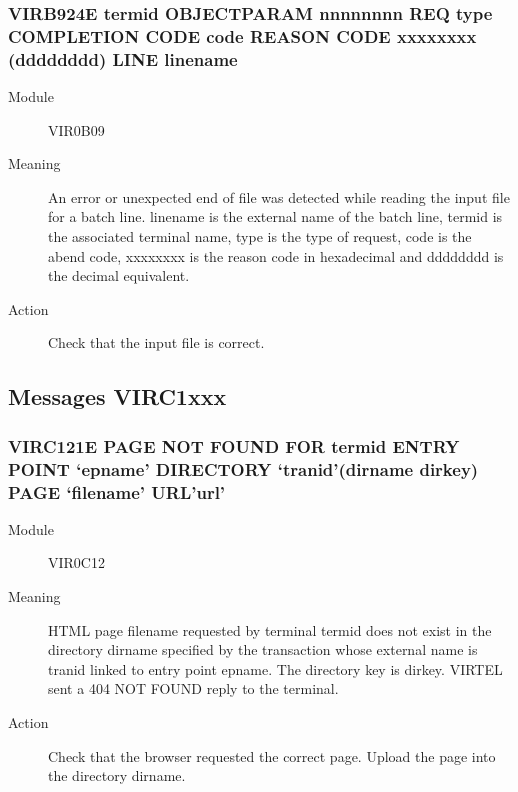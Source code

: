 \documentclass[letterpaper,10pt,english]{sphinxmanual}
\begin{document}
\subsubsection{VIRB924E termid OBJECT\textbar{}PARAM nnnnnnnn REQ type COMPLETION CODE code REASON CODE xxxxxxxx (dddddddd) LINE linename}
\label{\detokenize{messages:virb924e-termid-object-param-nnnnnnnn-req-type-completion-code-code-reason-code-xxxxxxxx-dddddddd-line-linename}}\begin{description}
\item[{Module}] \leavevmode
VIR0B09

\item[{Meaning}] \leavevmode
An error or unexpected end of file was detected while reading the input file for a batch line. linename is the external name of the batch line, termid is the associated terminal name, type is the type of request, code is the abend code, xxxxxxxx is the reason code in hexadecimal and dddddddd is the decimal equivalent.

\item[{Action}] \leavevmode
Check that the input file is correct.

\end{description}


\subsection{Messages VIRC1xxx}
\label{\detokenize{messages:messages-virc1xxx}}

\subsubsection{VIRC121E PAGE NOT FOUND FOR termid ENTRY POINT ‘epname’ DIRECTORY ‘tranid’(dirname dirkey) PAGE ‘filename’ URL’url’}
\label{\detokenize{messages:virc121e-page-not-found-for-termid-entry-point-epname-directory-tranid-dirname-dirkey-page-filename-url-url}}\begin{description}
\item[{Module}] \leavevmode
VIR0C12

\item[{Meaning}] \leavevmode
HTML page filename requested by terminal termid does not exist in the directory dirname specified by the transaction whose external name is tranid linked to entry point epname. The directory key is dirkey. VIRTEL sent a 404 NOT FOUND reply to the terminal.

\item[{Action}] \leavevmode
Check that the browser requested the correct page. Upload the page into the directory dirname.

\end{description}
\end{document}
